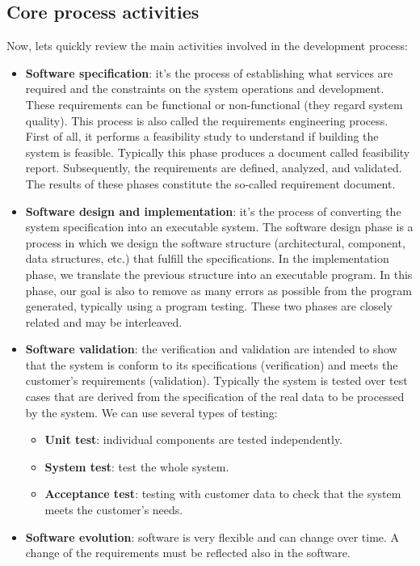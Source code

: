 \subsection{Core process activities}
Now, lets quickly review the main activities involved in the development process:
\begin{itemize}
    \item \textbf{Software specification}: it's the process of establishing what services are required and the constraints on the system operations and development. These requirements can be functional or non-functional (they regard system quality). This process is also called the requirements engineering process. First of all, it performs a feasibility study to understand if building the system is feasible. Typically this phase produces a document called feasibility report. Subsequently, the requirements are defined, analyzed, and validated. The results of these phases constitute the so-called requirement document.
    \item \textbf{Software design and implementation}: it's the process of converting the system specification into an executable system. The software design phase is a process in which we design the software structure (architectural, component, data structures, etc.) that fulfill the specifications. In the implementation phase, we translate the previous structure into an executable program. In this phase, our goal is also to remove as many errors as possible from the program generated, typically using a program testing. These two phases are closely related and may be interleaved.
    \item \textbf{Software validation}: the verification and validation are intended to show that the system is conform to its specifications (verification) and meets the customer's requirements (validation). Typically the system is tested over test cases that are derived from the specification of the real data to be processed by the system. We can use several types of testing:
          \begin{itemize}
              \item \textbf{Unit test}: individual components are tested independently.
              \item \textbf{System test}: test the whole system.
              \item \textbf{Acceptance test}: testing with customer data to check that the system meets the customer's needs.
          \end{itemize}
    \item \textbf{Software evolution}: software is very flexible and can change over time. A change of the requirements must be reflected also in the software.
\end{itemize}
